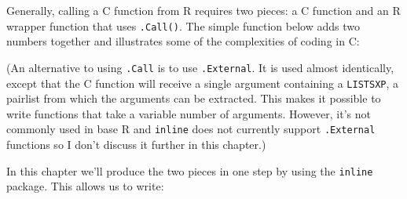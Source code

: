 
Generally, calling a C function from R requires two pieces: a C function
and an R wrapper function that uses \texttt{.Call()}. The simple
function below adds two numbers together and illustrates some of the
complexities of coding in C:

\begin{Shaded}
\begin{Highlighting}[]

  \NormalTok{));}
  \NormalTok{REAL(result)[}\NormalTok{] = asReal(a) + asReal(b);}
  \NormalTok{);}

   
\NormalTok{\}}
\end{Highlighting}
\end{Shaded}

\begin{Shaded}
\begin{Highlighting}[]
\StringTok{ }
  \NormalTok{(}
\NormalTok{\}}
\end{Highlighting}
\end{Shaded}

(An alternative to using \texttt{.Call} is to use \texttt{.External}. It
is used almost identically, except that the C function will receive a
single argument containing a \texttt{LISTSXP}, a pairlist from which the
arguments can be extracted. This makes it possible to write functions
that take a variable number of arguments. However, it's not commonly
used in base R and \texttt{inline} does not currently support
\texttt{.External} functions so I don't discuss it further in this
chapter.)  

In this chapter we'll produce the two pieces in one step by using the
\texttt{inline} package. This allows us to write: 

